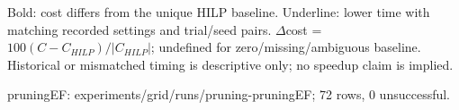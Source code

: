 \documentclass[10pt]{article}
\begin{document}
\medskip\footnotesize
Bold: cost differs from the unique HILP baseline. Underline: lower time with matching recorded settings and trial/seed pairs. $\Delta$cost = $100(C-C_{HILP})/|C_{HILP}|$; undefined for zero/missing/ambiguous baseline. Historical or mismatched timing is descriptive only; no speedup claim is implied.\par
pruningEF: experiments/grid/runs/pruning-pruningEF; 72 rows, 0 unsuccessful.\par
\end{document}
